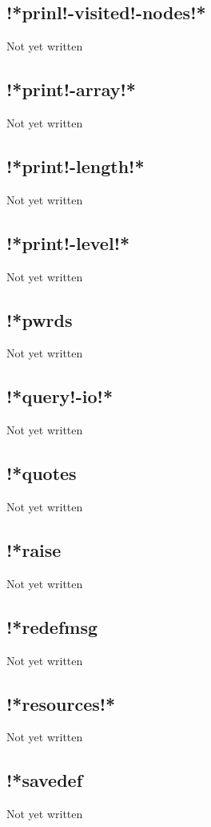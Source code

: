 \documentclass[a4paper,11pt]{article}
\begin{document}
\subsection{\ttfamily !*prinl!-visited!-nodes!*}
Not yet written

\subsection{\ttfamily !*print!-array!*}
Not yet written

\subsection{\ttfamily !*print!-length!*}
Not yet written

\subsection{\ttfamily !*print!-level!*}
Not yet written

\subsection{\ttfamily !*pwrds}
Not yet written

\subsection{\ttfamily !*query!-io!*}
Not yet written

\subsection{\ttfamily !*quotes}
Not yet written

\subsection{\ttfamily !*raise}
Not yet written

\subsection{\ttfamily !*redefmsg}
Not yet written

\subsection{\ttfamily !*resources!*}
Not yet written

\subsection{\ttfamily !*savedef}
Not yet written
\end{document}
